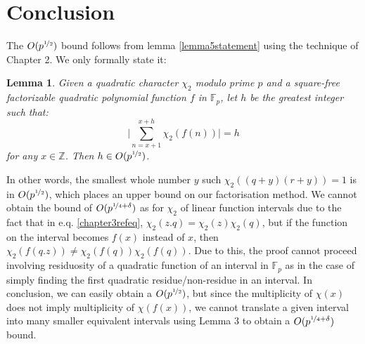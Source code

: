 \documentclass{report}
\newtheorem*{lemma*}{Lemma}
\begin{document}
\section{Conclusion}
%
The $O(p^{\nicefrac{1}{2}})$ bound follows from lemma \ref{lemma5statement} using the technique of Chapter 2. We only formally state it:
\begin{lemma*}
Given a quadratic character $\chi_2$ modulo prime $p$ and a square-free factorizable quadratic polynomial function $f$ in $\mathbb{F}_p$, let $h$ be the greatest integer such that:
\[\bigg\lvert\sum\limits_{n=x+1}^{x+h}\chi_2(f(n))\bigg\rvert=h\]
 for any $x\in\mathbb{Z}$. Then $h\in O(p^{\nicefrac{1}{2}})$.
\end{lemma*}
In other words, the smallest whole number $y$ such $\chi_2((q+y)(r+y))=1$ is in $O(p^{\nicefrac{1}{2}})$, which places an upper bound on our factorisation method.
We cannot obtain the bound of $O(p^{\nicefrac{1}{4}+\delta})$ as for $\chi_2$ of linear function intervals due to the fact that in e.q. \ref{chapter3refeq}, $\chi_2(z.q)=\chi_2(z)\chi_2(q)$, but if the function on the interval becomes $f(x)$ instead of $x$, then $\chi_2(f(q.z))\neq \chi_2(f(q))\chi_2(f(q))$. Due to this, the proof cannot proceed involving residuosity of a quadratic function of an interval in $\mathbb{F}_p$ as in the case of simply finding the first quadratic residue/non-residue in an interval. In conclusion, we can easily obtain a $O(p^{\nicefrac{1}{2}})$, but since the multiplicity of $\chi(x)$ does not imply multiplicity of $\chi(f(x))$, we cannot translate a given interval into many smaller equivalent intervals using Lemma 3 to obtain a $O(p^{\nicefrac{1}{4}+\delta})$ bound.
%
%
%
%
%
\end{document}
